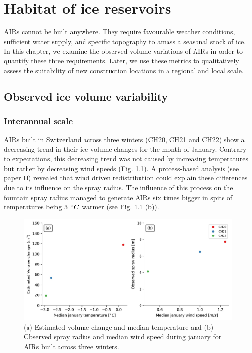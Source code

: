 \chapter{Habitat of ice reservoirs}


AIRs cannot be built anywhere. They require favourable weather conditions, sufficient water supply, and specific
topography to amass a seasonal stock of ice. In this chapter, we examine the observed volume variations of AIRs
in order to quantify these three requirements. Later, we use these metrics to qualitatively assess the
suitability of new construction locations in a regional and local scale.

\section{Observed ice volume variability}

\subsection{Interannual scale}

AIRs built in Switzerland across three winters (CH20, CH21 and CH22) show a decreasing trend in their ice volume
changes for the month of January. Contrary to expectations, this decreasing trend was not caused by increasing
temperatures but rather by decreasing wind speeds (Fig. \ref{fig:CH_diffs}). A process-based analysis (see paper
II) revealed that wind driven redistribution could explain these differences due to its influence on the spray
radius. The influence of this process on the fountain spray radius managed to generate AIRs six times bigger in
spite of temperatures being 3 $^{\circ} C$ warmer (see Fig. \ref{fig:CH_diffs} (b)). 

\begin{figure}[htb]
\centering
\includegraphics[width=\textwidth]{figs/CH_diffs.jpg}
\caption{(a) Estimated volume change and median temperature and (b) Observed spray radius and median wind speed
during january for AIRs built across three winters. } 
\label{fig:CH_diffs}
\end{figure}

